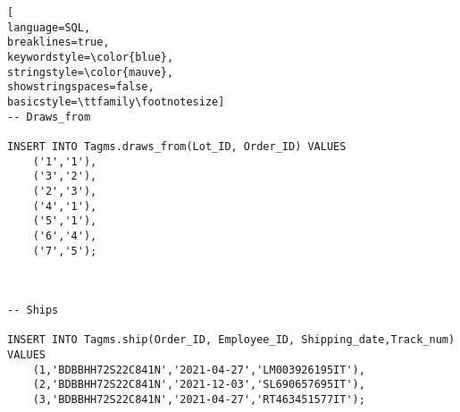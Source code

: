 \begin{lstlisting}[
language=SQL,
breaklines=true,
keywordstyle=\color{blue},
stringstyle=\color{mauve},
showstringspaces=false,
basicstyle=\ttfamily\footnotesize]
-- Draws_from

INSERT INTO Tagms.draws_from(Lot_ID, Order_ID) VALUES
    ('1','1'),
    ('3','2'),
    ('2','3'),
    ('4','1'),
    ('5','1'),
    ('6','4'),
    ('7','5');



-- Ships

INSERT INTO Tagms.ship(Order_ID, Employee_ID, Shipping_date,Track_num) VALUES
    (1,'BDBBHH72S22C841N','2021-04-27','LM003926195IT'),
    (2,'BDBBHH72S22C841N','2021-12-03','SL690657695IT'),
    (3,'BDBBHH72S22C841N','2021-04-27','RT463451577IT');


\end{lstlisting}